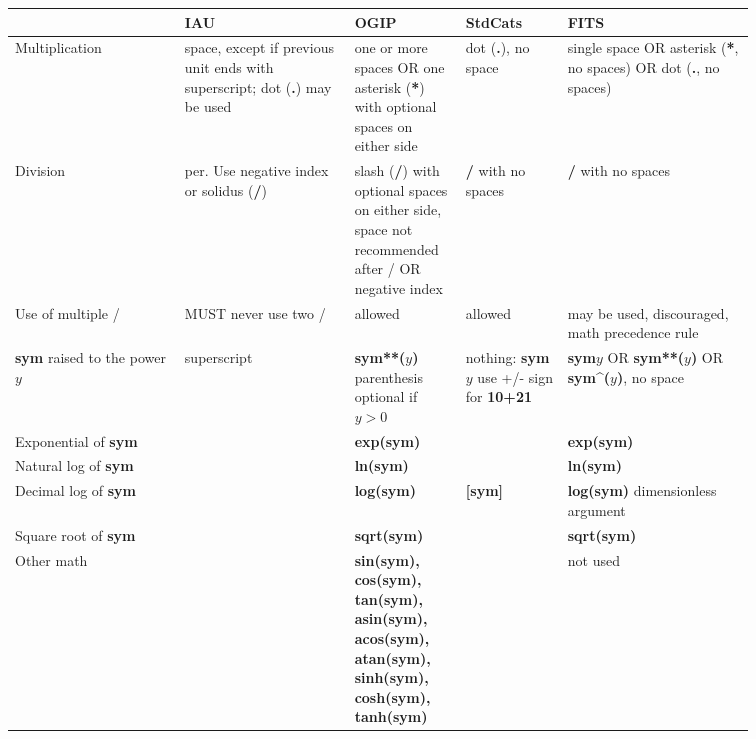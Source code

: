 \documentclass[12pt,notitlepage,onecolumn]{ivoa}
\newcommand{\unit}[1]{\textbf{\textsf{\color{orange}#1}}}
\begin{document}
\begin{longtable}[th]{|p{0.2\linewidth}|p{0.2\linewidth}|p{0.12\linewidth}|p{0.12\linewidth}|p{0.22\linewidth}|}
\hline
    & IAU & OGIP  & StdCats & FITS \\\hline
    Multiplication & space, except if previous unit ends with superscript; dot (\unit{.}) may be used\raggedright
    	& one or more spaces OR one asterisk (\unit{*}) with optional spaces on either side\raggedright 
	& dot (\unit{.}), no space 
	& single space OR asterisk (\unit{*}, no spaces) OR dot (\unit{.}, no spaces) \\\hline
    Division & per. Use negative index or solidus (\unit{/})\raggedright
    	& slash (\unit{/}) with optional spaces on either side, space not recommended after / OR negative index\raggedright
	& \unit{/} with no spaces 
	& \unit{/} with no spaces  \\\hline\hline
    Use of multiple / & MUST never use two /\raggedright 
    	& allowed 
	& allowed 
	& may be used, discouraged, math precedence rule \\\hline\hline
    \unit{sym} raised to the power $y$ & superscript 
    	& \unit{sym**($y$)} parenthesis optional if $y>0$ 
	& nothing: \unit{sym$y$} use +/- sign for \unit{10+21} 
	& \unit{sym$y$} OR \unit{sym**($y$)} OR \unit{sym\^{}($y$)}, no space \\\hline\hline
    Exponential of \unit{sym} &  & \unit{exp(sym)} &  & \unit{exp(sym)} \\\hline\hline
    Natural log of \unit{sym} &  & \unit{ln(sym)} &  & \unit{ln(sym)} \\\hline\hline
    Decimal log of \unit{sym} &  & \unit{log(sym)} & \unit{[sym]} & \unit{log(sym)} dimensionless argument \\\hline\hline
    Square root of \unit{sym} &  & \unit{sqrt(sym)} &  & \unit{sqrt(sym)} \\\hline\hline
    Other math &  & {\small \unit{sin(sym), cos(sym), tan(sym), asin(sym), acos(sym), atan(sym), sinh(sym), cosh(sym), tanh(sym)} } &  & not used \\\hline\hline

\end{longtable}
\end{document}

